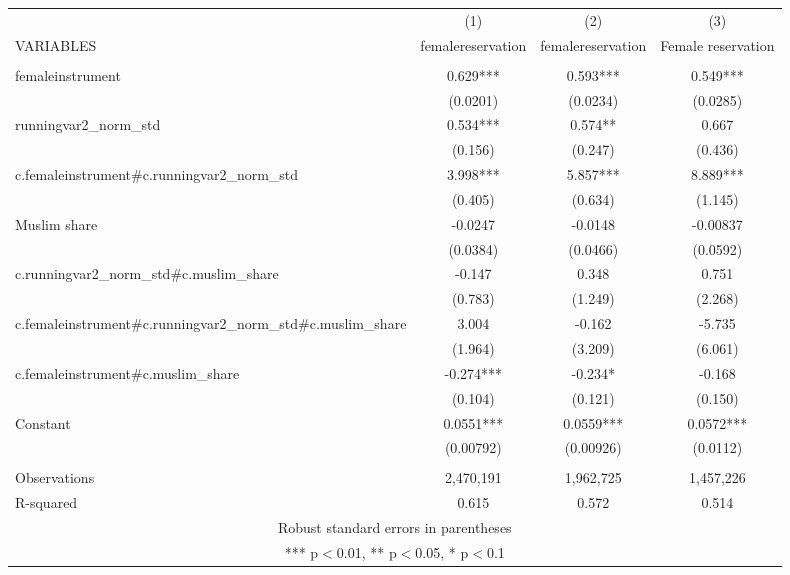 \begin{tabular}{lccc} \hline
 & (1) & (2) & (3) \\
VARIABLES & femalereservation & femalereservation & Female reservation \\ \hline
 &  &  &  \\
femaleinstrument & 0.629*** & 0.593*** & 0.549*** \\
 & (0.0201) & (0.0234) & (0.0285) \\
runningvar2\_norm\_std & 0.534*** & 0.574** & 0.667 \\
 & (0.156) & (0.247) & (0.436) \\
c.femaleinstrument\#c.runningvar2\_norm\_std & 3.998*** & 5.857*** & 8.889*** \\
 & (0.405) & (0.634) & (1.145) \\
Muslim share & -0.0247 & -0.0148 & -0.00837 \\
 & (0.0384) & (0.0466) & (0.0592) \\
c.runningvar2\_norm\_std\#c.muslim\_share & -0.147 & 0.348 & 0.751 \\
 & (0.783) & (1.249) & (2.268) \\
c.femaleinstrument\#c.runningvar2\_norm\_std\#c.muslim\_share & 3.004 & -0.162 & -5.735 \\
 & (1.964) & (3.209) & (6.061) \\
c.femaleinstrument\#c.muslim\_share & -0.274*** & -0.234* & -0.168 \\
 & (0.104) & (0.121) & (0.150) \\
Constant & 0.0551*** & 0.0559*** & 0.0572*** \\
 & (0.00792) & (0.00926) & (0.0112) \\
 &  &  &  \\
Observations & 2,470,191 & 1,962,725 & 1,457,226 \\
 R-squared & 0.615 & 0.572 & 0.514 \\ \hline
\multicolumn{4}{c}{ Robust standard errors in parentheses} \\
\multicolumn{4}{c}{ *** p$<$0.01, ** p$<$0.05, * p$<$0.1} \\
\end{tabular}
